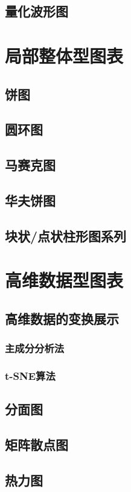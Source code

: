 \documentclass[openany]{progbookcn}
\begin{document}
\subsection{量化波形图}

\section{局部整体型图表}
\subsection{饼图}
\subsection{圆环图}
\subsection{马赛克图}
\subsection{华夫饼图}
\subsection{块状/点状柱形图系列}

\section{高维数据型图表}
\subsection{高维数据的变换展示}
\subsubsection{主成分分析法}
\subsubsection{t-SNE算法}
\subsection{分面图}
\subsection{矩阵散点图}
\subsection{热力图}
\end{document}
